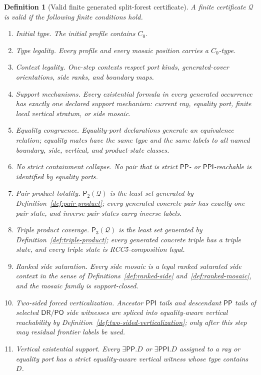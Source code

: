 \documentclass[11pt]{article}
\newtheorem{definition}[theorem]{Definition}
\newcommand{\DR}{\mathsf{DR}}
\newcommand{\PO}{\mathsf{PO}}
\newcommand{\PP}{\mathsf{PP}}
\newcommand{\PPI}{\mathsf{PPI}}
\newcommand{\Q}{\mathcal Q}
\newcommand{\Pairs}{\mathsf P_2}
\newcommand{\Triples}{\mathsf P_3}
\begin{document}
\begin{definition}[Valid finite generated split-forest certificate]\label{def:valid-certificate}
A finite certificate $\Q$ is valid if the following finite conditions hold.
\begin{enumerate}[label=(V\arabic*)]
\item \emph{Initial type.}  The initial profile contains $C_0$.
\item \emph{Type legality.}  Every profile and every mosaic position carries a $C_0$-type.
\item \emph{Context legality.}  One-step contexts respect port kinds, generated-cover orientations, side ranks, and boundary maps.
\item \emph{Support mechanisms.}  Every existential formula in every generated occurrence has exactly one declared support mechanism: current ray, equality port, finite local vertical stratum, or side mosaic.
\item \emph{Equality congruence.}  Equality-port declarations generate an equivalence relation; equality mates have the same type and the same labels to all named boundary, side, vertical, and product-state classes.
\item \emph{No strict containment collapse.}  No pair that is strict $\PP$- or $\PPI$-reachable is identified by equality ports.
\item \emph{Pair product totality.}  $\Pairs(\Q)$ is the least set generated by Definition~\ref{def:pair-product}; every generated concrete pair has exactly one pair state, and inverse pair states carry inverse labels.
\item \emph{Triple product coverage.}  $\Triples(\Q)$ is the least set generated by Definition~\ref{def:triple-product}; every generated concrete triple has a triple state, and every triple state is RCC5-composition legal.
\item \emph{Ranked side saturation.}  Every side mosaic is a legal ranked saturated side context in the sense of Definitions~\ref{def:ranked-side} and~\ref{def:ranked-mosaic}, and the mosaic family is support-closed.
\item \emph{Two-sided forced verticalization.}  Ancestor $\PPI$ tails and descendant $\PP$ tails of selected $\DR/\PO$ side witnesses are spliced into equality-aware vertical reachability by Definition~\ref{def:two-sided-verticalization}; only after this step may residual frontier labels be used.
\item \emph{Vertical existential support.}  Every $\exists\PP.D$ or $\exists\PPI.D$ assigned to a ray or equality port has a strict equality-aware vertical witness whose type contains $D$.

\end{enumerate}
\end{definition}
\end{document}
